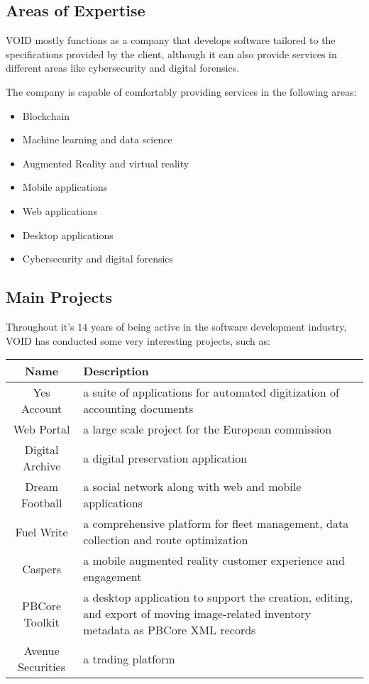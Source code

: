 \subsection{Areas of Expertise}

VOID mostly functions as a company that develops software tailored to the specifications provided by the client, although 
it can also provide services in different areas like cybersecurity and digital forensics.

The company is capable of comfortably providing services in the following areas:
\begin{itemize}
 \item Blockchain
 \item Machine learning and data science
 \item Augmented Reality and virtual reality
 \item Mobile applications
 \item Web applications
 \item Desktop applications
 \item Cybersecurity and digital forensics
\end{itemize}

\subsection{Main Projects}

Throughout it's 14 years of being active in the software development industry, VOID has conducted some very interesting projects, such as:

\begin{table}[h]
  \begin{tabularx}{\textwidth}{@{}|c| *1{>{\centering\arraybackslash}X}@{}|}
    \hline
    \textbf{Name} & \textbf{Description} \\
    \hline\hline
    Yes Account & a suite of applications for automated digitization of accounting documents \\
    \hline
    Web Portal & a large scale project for the European commission \\
    \hline
    Digital Archive & a digital preservation application \\
    \hline
    Dream Football & a social network along with web and mobile applications  \\
    \hline
    Fuel Write & a comprehensive platform for fleet management, data collection and route optimization \\
    \hline
    Caspers & a mobile augmented reality customer experience and engagement \\
    \hline
    PBCore Toolkit & a desktop application to support the creation, editing, and export of moving image-related inventory metadata as PBCore XML records \\
    \hline
    Avenue Securities & a trading platform \\
    \hline
  \end{tabularx}
\end{table}

